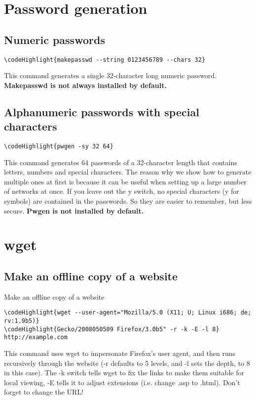 \documentclass[12pt,a4paper]{article}
\begin{document}
\section{Password generation}
\label{Password generation}
\subsection{Numeric passwords}
\begin{Verbatim}[commandchars=\\\{\}]
\codeHighlight{makepasswd --string 0123456789 --chars 32}
\end{Verbatim}
This command generates a single 32-character long numeric password. \textbf{Makepasswd is not always installed by default.}

\subsection{Alphanumeric passwords with special characters}
\begin{Verbatim}[commandchars=\\\{\}]
\codeHighlight{pwgen -sy 32 64}
\end{Verbatim}
This command generates 64 passwords of a 32-character length that contains letters, numbers and special characters. The reason why we show how to generate multiple ones at first is because it can be useful when setting up a large number of networks at once. If you leave out the y switch, no special characters (y for symbols) are contained in the passwords. So they are easier to remember, but less secure.  \textbf{Pwgen is not installed by default.}

\section{wget}
\subsection{Make an offline copy of a website}
\label{}Make an offline copy of a website
\begin{Verbatim}[commandchars=\\\{\}]
\codeHighlight{wget --user-agent="Mozilla/5.0 (X11; U; Linux i686; de; rv:1.9b5)}
\codeHighlight{Gecko/2008050509 Firefox/3.0b5" -r -k -E -l 8} http://example.com
\end{Verbatim}
This command uses wget to impersonate Firefox's user agent, and then runs recursively through the website (-r defaults to 5 levels, and -l sets the depth, to 8 in this case). The -k switch tells wget to fix the links to make them suitable for local viewing, -E tells it to adjust extensions (i.e. change .asp to .html).  Don't forget to change the URL!
\end{document}
